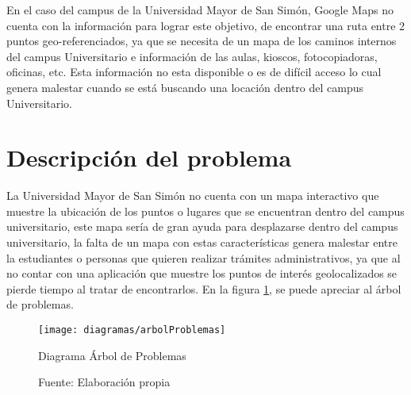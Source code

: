   En el caso del campus de la Universidad Mayor de San Simón, Google Maps no cuenta con la información para lograr este objetivo, de encontrar una ruta entre 2 puntos geo-referenciados, ya que se necesita de un mapa de los caminos internos del campus Universitario e información de las aulas, kioscos, fotocopiadoras, oficinas, etc. Esta información no esta disponible o es de difícil acceso lo cual genera malestar cuando se está buscando una locación dentro del campus Universitario.



  \section{Descripción del problema} %
  \label{sec:desc_probl}


  La Universidad Mayor de San Simón no cuenta con un mapa interactivo que
  muestre la ubicación de los puntos o lugares que se encuentran dentro del
  campus universitario, este mapa sería de gran ayuda para desplazarse dentro
  del campus universitario, la falta de un mapa con estas características
  genera malestar entre la estudiantes o personas que quieren realizar trámites
  administrativos, ya que al no contar con una aplicación que muestre los puntos de interés  geolocalizados se pierde tiempo al tratar de encontrarlos.
  En la figura \ref{fig:arbolProblemas}, se puede apreciar al árbol de problemas.



  \begin{figure}[H]
    \begin{center}
      \texttt{[image: diagramas/arbolProblemas]}
    \end{center}
    \caption{Diagrama Árbol de Problemas}
    \label{fig:arbolProblemas}
    \caption*{Fuente: Elaboración propia}
  \end{figure}

